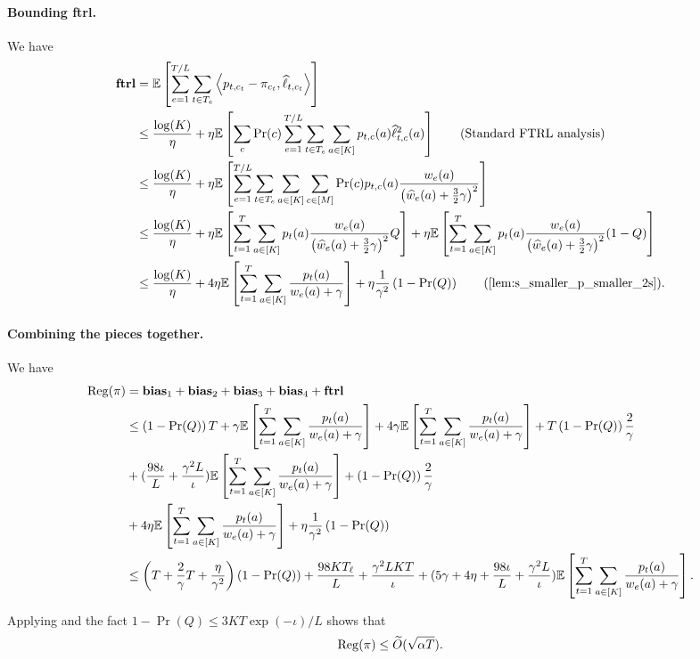 \paragraph{Bounding ftrl.} We have
\begin{align*}
\mathbf{ftrl} &= \mathbb{E} \left[ \sum_{e=1}^{T/L} \sum_{t \in T_e} \ip{ p_{t,c_t} - \pi_{c_t}, \widehat{\ell}_{t,c_t} } \right] \\
&\le \frac{\log(K)}{\eta} + \eta \mathbb{E} \left[ 
\sum_{c} \Pr(c) \sum_{e=1}^{T/L} \sum_{t \in T_e} \sum_{a \in[K]} p_{t,c}(a) \widehat{\ell}^2_{t,c}(a) \right] \tag{Standard FTRL analysis}\\
%
&\le \frac{\log(K)}{\eta} + \eta \E\left[
\sum_{e=1}^{T/L} \sum_{t \in T_e} \sum_{a \in[K]} \sum_{c \in [M]} 
\Pr(c) p_{t,c}(a) \frac{w_{e}(a)}{\left( \widehat{w}_{e}(a) + \frac{3}{2} \gamma \right)^2} \right] \\
%
&\le \frac{\log(K)}{\eta} + \eta \E\left[
\sum_{t=1}^T \sum_{a \in[K]} p_t(a) \frac{w_{e}(a)}{\left( \widehat{w}_{e}(a) + \frac{3}{2} \gamma \right)^2} Q \right] + \eta \E\left[
\sum_{t=1}^T \sum_{a \in[K]}  p_{t}(a) \frac{w_{e}(a)}{\left( \widehat{w}_{e}(a) + \frac{3}{2} \gamma \right)^2} (1-Q) \right] \\
%
&\leq \frac{\log(K)}{\eta} + 4\eta\E\left[\sum_{t=1}^T \sum_{a\in[K]} \frac{p_t(a)}{w_e(a)+ \gamma}  \right] + \eta \frac{1}{\gamma^2} \left(1 - \Pr(Q)\right) \tag{\Cref{lem:s_smaller_p_smaller_2s}}.
\end{align*}

\paragraph{Combining the pieces together.} We have
\begin{align*}
    \Reg(\pi) &= \bias{1} + \bias{2} + \bias{3} + \bias{4} + \textbf{ftrl} \\
%
    &\le \left( 1- \Pr(Q) \right) T + \gamma \E\left[\sum_{t=1}^T\sum_{a\in[K]} \frac{p_t(a)}{w_e(a)+ \gamma} \right]  +  4 \gamma  \E\left[\sum_{t=1}^T\sum_{a\in[K]} \frac{p_t(a)}{w_e(a)+ \gamma} \right]  + T \left(1 - \Pr(Q)\right) \frac{2}{\gamma} \\
    &+ (\frac{98 \iota}{L}  + \frac{\gamma^2 L }{\iota}) \E\left[\sum_{t=1}^T\sum_{a\in[K]} \frac{p_t(a)}{w_e(a)+ \gamma} \right]  +  \left(1-\Pr(Q)\right) \frac{2}{\gamma}  \\
    &+ 4\eta\E\left[\sum_{t=1}^T\sum_{a\in[K]} \frac{p_t(a)}{w_e(a)+ \gamma} \right] + \eta \frac{1}{\gamma^2} \left(1 - \Pr(Q)\right) \\
%
    &\le \left(T + \frac{2}{\gamma}T + \frac{\eta}{\gamma^2} \right) \left(1-\Pr(Q) \right) +  \frac{98 K T_\ell}{L} + \frac{\gamma^2 L K T}{\iota}  + (5\gamma+ 4\eta + \frac{98 \iota}{L}  + \frac{\gamma^2 L }{\iota}) \E\left[\sum_{t=1}^T\sum_{a\in[K]} \frac{p_t(a)}{w_e(a)+ \gamma} \right].
\end{align*}

Applying  and the fact $1 - \Pr(Q) \le 3KT\exp(-\iota)/L$ shows that 
\[\operatorname{\mathrm{Reg}}(\pi) \le \widetilde{O}(\sqrt{\alpha T}).\]